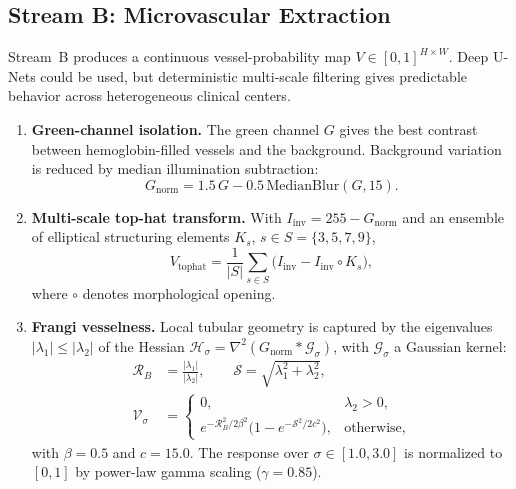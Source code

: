 \documentclass[conference]{IEEEtran}
\begin{document}
\subsection{Stream B: Microvascular Extraction}
Stream~B produces a continuous vessel-probability map $V\in[0,1]^{H\times W}$. Deep U-Nets could be used, but deterministic multi-scale filtering gives predictable behavior across heterogeneous clinical centers.
\begin{enumerate}
\item \textbf{Green-channel isolation.} The green channel $G$ gives the best contrast between hemoglobin-filled vessels and the background. Background variation is reduced by median illumination subtraction:
\begin{equation}
G_{\mathrm{norm}}=1.5\,G-0.5\,\mathrm{MedianBlur}(G,15).
\end{equation}
\item \textbf{Multi-scale top-hat transform.} With $I_{\mathrm{inv}}=255-G_{\mathrm{norm}}$ and an ensemble of elliptical structuring elements $K_s$, $s\in S=\{3,5,7,9\}$,
\begin{equation}
V_{\mathrm{tophat}}=\frac{1}{|S|}\sum_{s\in S}\big(I_{\mathrm{inv}}-I_{\mathrm{inv}}\circ K_s\big),
\end{equation}
where $\circ$ denotes morphological opening.
\item \textbf{Frangi vesselness.} Local tubular geometry is captured by the eigenvalues $|\lambda_1|\le|\lambda_2|$ of the Hessian $\mathcal{H}_\sigma=\nabla^2(G_{\mathrm{norm}}*\mathcal{G}_\sigma)$, with $\mathcal{G}_\sigma$ a Gaussian kernel:
\begin{align}
\mathcal{R}_B&=\frac{|\lambda_1|}{|\lambda_2|},\qquad \mathcal{S}=\sqrt{\lambda_1^2+\lambda_2^2},\\
\mathcal{V}_\sigma&=\begin{cases}
0, & \lambda_2>0,\\[2pt]
e^{-\mathcal{R}_B^2/2\beta^2}\big(1-e^{-\mathcal{S}^2/2c^2}\big), & \text{otherwise,}
\end{cases}
\end{align}
with $\beta=0.5$ and $c=15.0$. The response over $\sigma\in[1.0,3.0]$ is normalized to $[0,1]$ by power-law gamma scaling ($\gamma=0.85$).
\end{enumerate}
\end{document}
